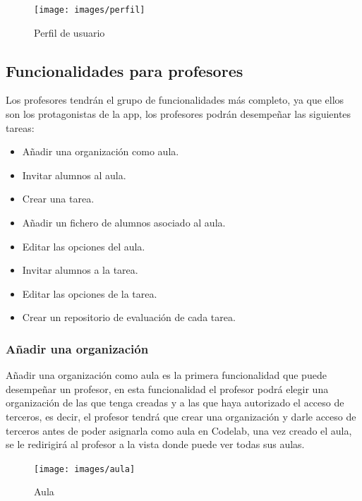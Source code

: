 \begin{figure}[!th]
\begin{center}
\texttt{[image: images/perfil]}
\caption{Perfil de usuario}
\label{fig:Perfil de usuario}
\end{center}
\end{figure}

\newpage

\subsection{Funcionalidades para profesores}
\label{3:6:2}

Los profesores tendrán el grupo de funcionalidades más completo, ya que ellos son los protagonistas de la app, los profesores podrán desempeñar las siguientes tareas:

\begin{itemize}
  \item Añadir una organización como aula.
  \item Invitar alumnos al aula.
  \item Crear una tarea.
  \item Añadir un fichero de alumnos asociado al aula.
  \item Editar las opciones del aula.
  \item Invitar alumnos a la tarea.
  \item Editar las opciones de la tarea.
  \item Crear un repositorio de evaluación de cada tarea.
\end{itemize}

\subsubsection{Añadir una organización}

Añadir una organización como aula es la primera funcionalidad que puede desempeñar un profesor, en esta funcionalidad el profesor podrá elegir una organización de las que tenga creadas y a las que haya autorizado el acceso de terceros, 
es decir, el profesor tendrá que crear una organización y darle acceso de terceros antes de poder asignarla como aula en Codelab, una vez creado el aula, se le redirigirá al profesor a la vista donde puede ver todas sus aulas.

\begin{figure}[!th]
\begin{center}
\texttt{[image: images/aula]}
\caption{Aula}
\label{fig:Aula}
\end{center}
\end{figure}

